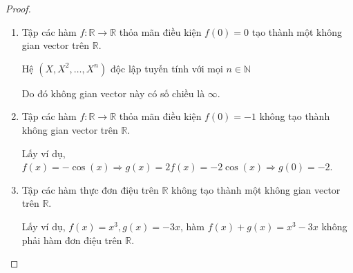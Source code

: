 \documentclass[class=linearalgebra,crop=false]{standalone}
\begin{document}
\begin{proof}
\begin{enumerate}[label*= (\alph*),itemsep=0pt]
        \item Tập các hàm $f: \mathbb{R}\rightarrow\mathbb{R}$ thỏa mãn điều kiện $f(0) = 0$ tạo thành một không gian vector trên $\mathbb{R}$.
            \par Hệ $(X, X^{2}, \ldots, X^{n})$ độc lập tuyến tính với mọi $n\in\mathbb{N}$
            \par Do đó không gian vector này có số chiều là $\infty$.
        \item Tập các hàm $f: \mathbb{R}\rightarrow\mathbb{R}$ thỏa mãn điều kiện $f(0) = -1$ không tạo thành không gian vector trên $\mathbb{R}$.
            \par Lấy ví dụ, $f(x) = -\cos (x)\Rightarrow g(x) = 2f(x) = -2\cos (x)\Rightarrow g(0) = -2$.
        \item Tập các hàm thực đơn điệu trên $\mathbb{R}$ không tạo thành một không gian vector trên $\mathbb{R}$.
            \par Lấy ví dụ, $f(x) = x^{3}, g(x) = -3x$, hàm $f(x) + g(x) = x^{3} - 3x$ không phải hàm đơn điệu trên $\mathbb{R}$.
    \end{enumerate}
\end{proof}
\end{document}
